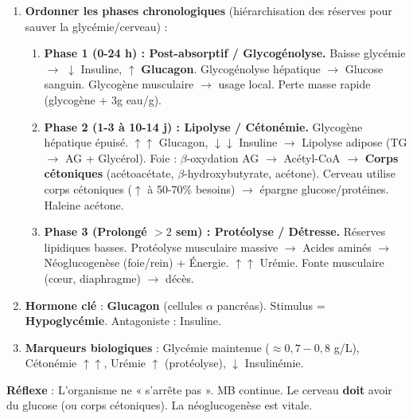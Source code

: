 \documentclass[11pt]{article}
\begin{document}
\begin{methode}
\begin{enumerate}
\item \textbf{Ordonner les phases chronologiques} (hiérarchisation des réserves pour sauver la glycémie/cerveau) :
\begin{enumerate}
\item \textbf{Phase 1 (0-24 h) : Post-absorptif / Glycogénolyse.} Baisse glycémie $\rightarrow$ $\downarrow$ Insuline, $\uparrow$ \textbf{Glucagon}. Glycogénolyse hépatique $\rightarrow$ Glucose sanguin. Glycogène musculaire $\rightarrow$ usage local. Perte masse rapide (glycogène + 3g eau/g).
\item \textbf{Phase 2 (1-3 à 10-14 j) : Lipolyse / Cétonémie.} Glycogène hépatique épuisé. $\uparrow\uparrow$ Glucagon, $\downarrow\downarrow$ Insuline $\rightarrow$ Lipolyse adipose (TG $\rightarrow$ AG + Glycérol). Foie : $\beta$-oxydation AG $\rightarrow$ Acétyl-CoA $\rightarrow$ \textbf{Corps cétoniques} (acétoacétate, $\beta$-hydroxybutyrate, acétone). Cerveau utilise corps cétoniques ($\uparrow$ à 50-70\% besoins) $\rightarrow$ épargne glucose/protéines. Haleine acétone.
\item \textbf{Phase 3 (Prolongé $> 2$ sem) : Protéolyse / Détresse.} Réserves lipidiques basses. Protéolyse musculaire massive $\rightarrow$ Acides aminés $\rightarrow$ Néoglucogenèse (foie/rein) + Énergie. $\uparrow\uparrow$ Urémie. Fonte musculaire (cœur, diaphragme) $\rightarrow$ décès.
\end{enumerate}
\item \textbf{Hormone clé} : \textbf{Glucagon} (cellules $\alpha$ pancréas). Stimulus = \textbf{Hypoglycémie}. Antagoniste : Insuline.
\item \textbf{Marqueurs biologiques} : Glycémie maintenue ($\approx 0,7-0,8$ g/L), Cétonémie $\uparrow\uparrow$, Urémie $\uparrow$ (protéolyse), $\downarrow$ Insulinémie.
\end{enumerate}
\textbf{Réflexe} : L'organisme ne « s'arrête pas ». MB continue. Le cerveau \textbf{doit} avoir du glucose (ou corps cétoniques). La néoglucogenèse est vitale.
\end{methode}
\end{document}
